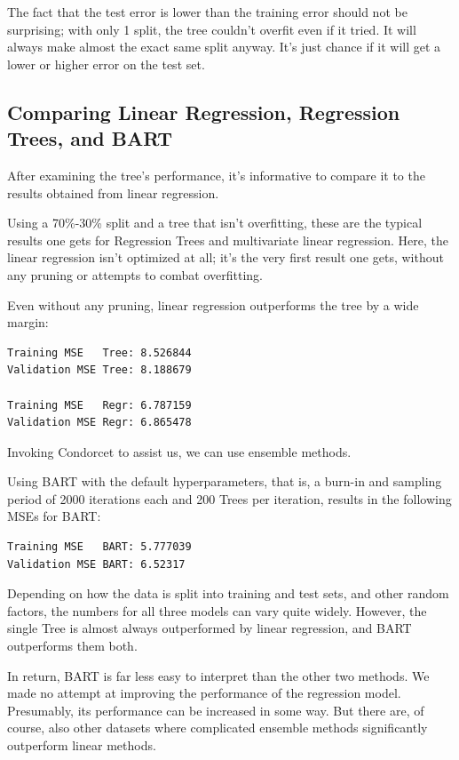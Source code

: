 \documentclass[12pt]{article}
\begin{document}
The fact that the test error is lower than the training error should not be surprising; with only 1 split, the tree couldn't overfit even if it tried. It will always make almost the exact same split anyway. It's just chance if it will get a lower or higher error on the test set.



\subsection{Comparing Linear Regression, Regression Trees, and BART}

After examining the tree's performance, it's informative to compare it to the results obtained from linear regression.

Using a 70\%-30\% split and a tree that isn't overfitting, these are the typical results one gets for Regression Trees and multivariate linear regression. Here, the linear regression isn't optimized at all; it's the very first result one gets, without any pruning or attempts to combat overfitting.

Even without any pruning, linear regression outperforms the tree by a wide margin:

\begin{verbatim}
Training MSE   Tree: 8.526844 
Validation MSE Tree: 8.188679 

Training MSE   Regr: 6.787159 
Validation MSE Regr: 6.865478
\end{verbatim}

Invoking Condorcet to assist us, we can use ensemble methods.

Using BART with the default hyperparameters, that is, a burn-in and sampling period of 2000 iterations each and 200 Trees per iteration, results in the following MSEs for BART:

\begin{verbatim}
Training MSE   BART: 5.777039 
Validation MSE BART: 6.52317
\end{verbatim}

Depending on how the data is split into training and test sets, and other random factors, the numbers for all three models can vary quite widely. However, the single Tree is almost always outperformed by linear regression, and BART outperforms them both.

In return, BART is far less easy to interpret than the other two methods. We made no attempt at improving the performance of the regression model. Presumably, its performance can be increased in some way. But there are, of course, also other datasets where complicated ensemble methods significantly outperform linear methods.
\end{document}
